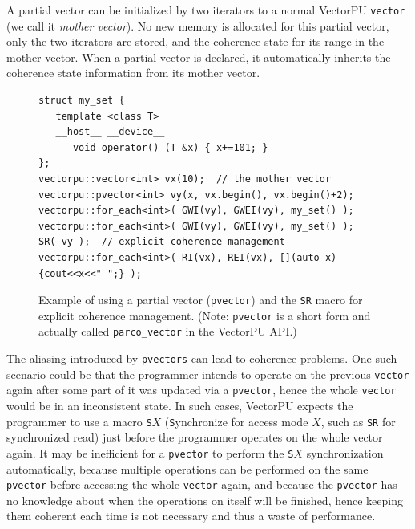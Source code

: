 A partial vector can be initialized by two iterators to a normal VectorPU \texttt{vector} (we call it \emph{mother vector}).
No new memory is allocated for this partial vector, 
only the two iterators are stored, 
and the coherence state for its range in the mother vector.
When a partial vector is declared, it automatically
inherits the coherence state information
from its mother vector. 

\begin{figure}
\noindent 
\begin{minipage}{\linewidth}
\begin{footnotesize}%
\begin{verbatim}
struct my_set {
   template <class T>
   __host__ __device__
      void operator() (T &x) { x+=101; } 
};
vectorpu::vector<int> vx(10);  // the mother vector
vectorpu::pvector<int> vy(x, vx.begin(), vx.begin()+2);
vectorpu::for_each<int>( GWI(vy), GWEI(vy), my_set() );
vectorpu::for_each<int>( GWI(vy), GWEI(vy), my_set() );
SR( vy );  // explicit coherence management
vectorpu::for_each<int>( RI(vx), REI(vx), [](auto x) {cout<<x<<" ";} );  
\end{verbatim}
\end{footnotesize}
\end{minipage}
\caption{\label{fig:pvector}Example of using a partial vector (\texttt{pvector}) and the \texttt{SR} macro for explicit coherence management. (Note: \texttt{pvector} is a short form and actually called \texttt{parco\_vector} in the VectorPU API.)}
\end{figure}

The aliasing introduced by \texttt{pvectors} can lead to coherence problems. One such scenario could be that the
programmer intends to operate on the previous \texttt{vector} again after
some part of it was updated via a \texttt{pvector}, 
hence the whole \texttt{vector} would be in an inconsistent state.
In such cases, VectorPU expects the programmer to use a macro \texttt{S$X$} (\texttt{S}ynchronize for access mode $X$,
such as \verb.SR. for synchronized read)
just before the programmer operates on the whole vector again.
It may be inefficient for a \texttt{pvector} to perform the \texttt{S$X$} synchronization
automatically, because multiple operations can be performed on the same \texttt{pvector} 
before accessing the whole \texttt{vector} again, 
and because the \texttt{pvector}
has no knowledge about when the operations on itself will be finished, hence
keeping them coherent each time is not necessary and thus a waste of performance.

